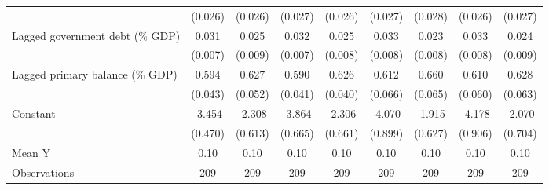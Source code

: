 {\begin{tabular}{l*{8}{c}}
                    &     (0.026)         &     (0.026)         &     (0.027)         &     (0.026)         &     (0.027)         &     (0.028)         &     (0.026)         &     (0.027)         \\
\addlinespace
Lagged government debt (\% GDP)&       0.031\sym{***}&       0.025\sym{**} &       0.032\sym{***}&       0.025\sym{**} &       0.033\sym{***}&       0.023\sym{**} &       0.033\sym{***}&       0.024\sym{**} \\
                    &     (0.007)         &     (0.009)         &     (0.007)         &     (0.008)         &     (0.008)         &     (0.008)         &     (0.008)         &     (0.009)         \\
\addlinespace
Lagged primary balance (\% GDP)&       0.594\sym{***}&       0.627\sym{***}&       0.590\sym{***}&       0.626\sym{***}&       0.612\sym{***}&       0.660\sym{***}&       0.610\sym{***}&       0.628\sym{***}\\
                    &     (0.043)         &     (0.052)         &     (0.041)         &     (0.040)         &     (0.066)         &     (0.065)         &     (0.060)         &     (0.063)         \\
\addlinespace
Constant            &      -3.454\sym{***}&      -2.308\sym{***}&      -3.864\sym{***}&      -2.306\sym{***}&      -4.070\sym{***}&      -1.915\sym{**} &      -4.178\sym{***}&      -2.070\sym{**} \\
                    &     (0.470)         &     (0.613)         &     (0.665)         &     (0.661)         &     (0.899)         &     (0.627)         &     (0.906)         &     (0.704)         \\
\midrule
Mean Y              &        0.10         &        0.10         &        0.10         &        0.10         &        0.10         &        0.10         &        0.10         &        0.10         \\
Observations        &         209         &         209         &         209         &         209         &         209         &         209         &         209         &         209         \\
\bottomrule
\end{tabular}
}
